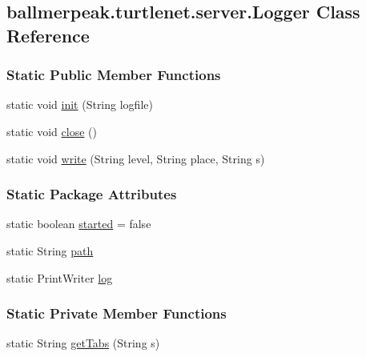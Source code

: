\hypertarget{classballmerpeak_1_1turtlenet_1_1server_1_1Logger}{\subsection{ballmerpeak.\-turtlenet.\-server.\-Logger Class Reference}
\label{classballmerpeak_1_1turtlenet_1_1server_1_1Logger}
}
\subsubsection*{Static Public Member Functions}
\begin{DoxyCompactItemize}
\item 
static void \hyperlink{classballmerpeak_1_1turtlenet_1_1server_1_1Logger_aa23612b75f5e3ba1d77e1f2dc60ec514}{init} (String logfile)
\item 
static void \hyperlink{classballmerpeak_1_1turtlenet_1_1server_1_1Logger_a529af97ac0cd6d79ca22f47aa75ccfe7}{close} ()
\item 
static void \hyperlink{classballmerpeak_1_1turtlenet_1_1server_1_1Logger_aa3ebd83be6d967692fae7980eb7b146f}{write} (String level, String place, String s)
\end{DoxyCompactItemize}
\subsubsection*{Static Package Attributes}
\begin{DoxyCompactItemize}
\item 
static boolean \hyperlink{classballmerpeak_1_1turtlenet_1_1server_1_1Logger_acd0e511fcc5838a9fac44ea93121b196}{started} = false
\item 
static String \hyperlink{classballmerpeak_1_1turtlenet_1_1server_1_1Logger_a708f083875f540ac0ef58e21eb4b0f9c}{path}
\item 
static Print\-Writer \hyperlink{classballmerpeak_1_1turtlenet_1_1server_1_1Logger_a136d9200b2f7cc5b5fa6820a94e638f3}{log}
\end{DoxyCompactItemize}
\subsubsection*{Static Private Member Functions}
\begin{DoxyCompactItemize}
\item 
static String \hyperlink{classballmerpeak_1_1turtlenet_1_1server_1_1Logger_ab10e5c8454d7cdf047b2c53bf040afc0}{get\-Tabs} (String s)
\end{DoxyCompactItemize}


